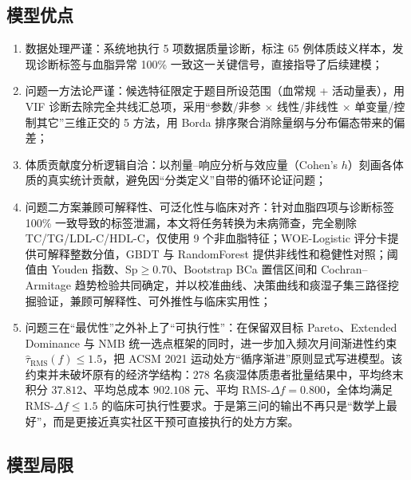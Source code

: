 \documentclass{MathorCupmodeling}
\providecommand{\tightlist}{%
  \setlength{\itemsep}{0pt}\setlength{\parskip}{0pt}}
\begin{document}
\subsection{模型优点}

\begin{enumerate}
\def\labelenumi{(\arabic{enumi})}
\tightlist
\item 数据处理严谨：系统地执行 5 项数据质量诊断，标注 65 例体质歧义样本，发现诊断标签与血脂异常 100\% 一致这一关键信号，直接指导了后续建模；
\item 问题一方法论严谨：候选特征限定于题目所设范围（血常规 + 活动量表），用 VIF 诊断去除完全共线汇总项，采用``参数/非参 $\times$ 线性/非线性 $\times$ 单变量/控制其它''三维正交的 5 方法，用 Borda 排序聚合消除量纲与分布偏态带来的偏差；
\item 体质贡献度分析逻辑自洽：以剂量--响应分析与效应量（Cohen's $h$）刻画各体质的真实统计贡献，避免因``分类定义''自带的循环论证问题；
\item 问题二方案兼顾可解释性、可泛化性与临床对齐：针对血脂四项与诊断标签 100\% 一致导致的标签泄漏，本文将任务转换为未病筛查，完全剔除 TC/TG/LDL-C/HDL-C，仅使用 9 个非血脂特征；WOE-Logistic 评分卡提供可解释整数分值，GBDT 与 RandomForest 提供非线性和稳健性对照；阈值由 Youden 指数、Sp$\ge0.70$、Bootstrap BCa 置信区间和 Cochran--Armitage 趋势检验共同确定，并以校准曲线、决策曲线和痰湿子集三路径挖掘验证，兼顾可解释性、可外推性与临床实用性；
\item 问题三在``最优性''之外补上了``可执行性''：在保留双目标 Pareto、Extended Dominance 与 NMB 统一选点框架的同时，进一步加入频次月间渐进性约束 $\widehat\tau_{\mathrm{RMS}}(f)\le 1.5$，把 ACSM 2021 运动处方``循序渐进''原则显式写进模型。该约束并未破坏原有的经济学结构：$278$ 名痰湿体质患者批量结果中，平均终末积分 $37.812$、平均总成本 $902.108$ 元、平均 RMS-$\Delta f=0.800$，全体均满足 RMS-$\Delta f\le 1.5$ 的临床可执行性要求。于是第三问的输出不再只是``数学上最好''，而是更接近真实社区干预可直接执行的处方方案。
\end{enumerate}

\subsection{模型局限}
\end{document}
